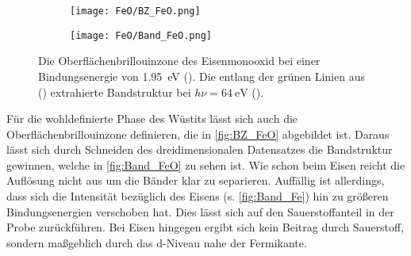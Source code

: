         \begin{figure}
            \begin{subfigure}[t]{0.34\textwidth}
                \centering
                \texttt{[image: FeO/BZ\_FeO.png]}
                \subcaption{}
                \label{fig:BZ_FeO}
            \end{subfigure}
            \begin{subfigure}[t]{0.62\textwidth}
                \centering
                \texttt{[image: FeO/Band\_FeO.png]}
                \subcaption{}
                \label{fig:Band_FeO}
            \end{subfigure}
            \caption{Die Oberflächenbrillouinzone des Eisenmonooxid bei einer Bindungsenergie von \SI{1.95}{\electronvolt} ().
            Die entlang der grünen Linien aus () extrahierte Bandstruktur bei $h\nu = \SI{64}{\electronvolt}$ ().}
        \end{figure}
        Für die wohldefinierte Phase des Wüstits lässt sich auch die Oberflächenbrillouinzone definieren, die in \autoref{fig:BZ_FeO} abgebildet ist.
        Daraus lässt sich durch Schneiden des dreidimensionalen Datensatzes die Bandstruktur gewinnen, welche in \autoref{fig:Band_FeO} zu sehen ist.
        Wie schon beim Eisen reicht die Auflösung nicht aus um die Bänder klar zu separieren.
        Auffällig ist allerdings, dass sich die Intensität bezüglich des Eisens (s. \autoref{fig:Band_Fe}) hin zu größeren Bindungsenergien verschoben hat.
        Dies lässt sich auf den Sauerstoffanteil in der Probe zurückführen. 
        Bei Eisen hingegen ergibt sich kein Beitrag durch Sauerstoff, sondern maßgeblich durch das d-Niveau nahe der Fermikante.
    
